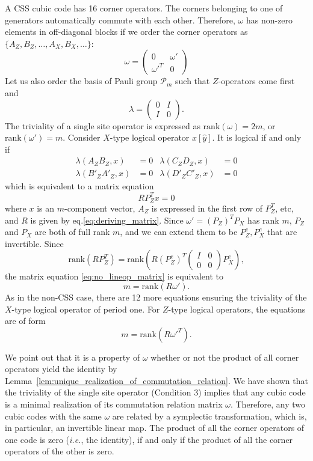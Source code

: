 \documentclass[letterpaper,10pt,pra,aps,showpacs,twocolumn]{revtex4-1}
\theoremstyle{definition} \newtheorem{defn}{Definition}
\theoremstyle{definition} \newtheorem{remark}{Remark}
\newcommand{\rank}{\mathrm{rank}}
\newcommand{\ie}{\emph{i.e.}}
\begin{document}
A CSS cubic code has 16 corner operators. The corners belonging to one of generators automatically commute with each other. Therefore, $\omega$ has non-zero elements in off-diagonal blocks if we order the corner operators as $\{ A_Z, B_Z ,\ldots, A_X, B_X, \ldots \}$:
\[
 \omega =
\begin{pmatrix}
 0 & \omega' \\
 \omega'^T & 0
\end{pmatrix}
\]
Let us also order the basis of Pauli group $\mathcal{P}_m$ such that $Z$-operators come first and
\[
 \lambda =
\begin{pmatrix}
 0 & I \\
 I & 0
\end{pmatrix} .
\]
The triviality of a single site operator is expressed as $ \rank( \omega ) = 2m$, or $\rank( \omega' ) = m$. Consider $X$-type logical operator $x[\hat{y}]$. It is logical if and only if
\begin{align*}
\lambda(A_Z  B_Z,  x) &=0 &
\lambda(C_Z  D_Z,  x) &=0 \\
\lambda(B'_Z A'_Z, x) &=0 &
\lambda(D'_Z C'_Z, x) &=0
\end{align*}
which is equivalent to a matrix equation
\begin{equation}
 R P_Z^T x = 0
\label{eq:no_lineop_matrix}
\end{equation}
where $x$ is an $m$-component vector, $A_Z$ is expressed in the first row of $P_Z^T$, etc, and $R$ is given by eq.\eqref{eq:deriving_matrix}. Since $\omega' = (P_Z)^T P_X$ has rank $m$, $P_Z$ and $P_X$ are both of full rank $m$, and we can extend them to be $P_Z^e, P_X^e$ that are invertible. Since
\[
\rank(R P_Z^T)=\rank \left(  R (P^e_Z)^T \begin{pmatrix} I & 0 \\ 0 & 0 \end{pmatrix} P^e_X \right),
\]
the matrix equation \eqref{eq:no_lineop_matrix} is equivalent to 
\begin{equation}
 m = \rank ( R \omega') .
\end{equation}
As in the non-CSS case, there are 12 more equations ensuring the triviality of the $X$-type logical operator of period one. For $Z$-type logical operators, the equations are of form
\begin{equation}
 m = \rank ( R \omega'^T) .
\end{equation}

We point out that it is a property of $\omega$ whether or not the product of all corner operators yield the identity by Lemma~\ref{lem:unique_realization_of_commutation_relation}. We have shown that the triviality of the single site operator (Condition 3) implies that any cubic code is a minimal realization of its commutation relation matrix $\omega$. Therefore, any two cubic codes with the same $\omega$ are related by a symplectic transformation, which is, in particular, an invertible linear map. The product of all the corner operators of one code is zero (\ie, the identity), if and only if the product of all the corner operators of the other is zero.
\end{document}
